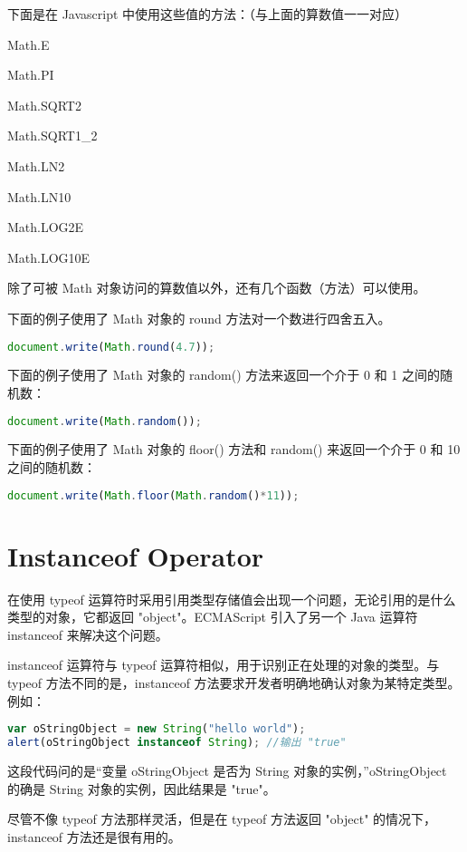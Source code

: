 下面是在 Javascript 中使用这些值的方法：（与上面的算数值一一对应）

\begin{compactitem}
\item Math.E
\item Math.PI
\item Math.SQRT2
\item Math.SQRT1\_2
\item Math.LN2
\item Math.LN10
\item Math.LOG2E
\item Math.LOG10E
\end{compactitem}

除了可被 Math 对象访问的算数值以外，还有几个函数（方法）可以使用。

下面的例子使用了 Math 对象的 round 方法对一个数进行四舍五入。

\begin{lstlisting}[language=JavaScript]
document.write(Math.round(4.7));
\end{lstlisting}



下面的例子使用了 Math 对象的 random() 方法来返回一个介于 0 和 1 之间的随机数：


\begin{lstlisting}[language=JavaScript]
document.write(Math.random());
\end{lstlisting}

下面的例子使用了 Math 对象的 floor() 方法和 random() 来返回一个介于 0 和 10 之间的随机数：

\begin{lstlisting}[language=JavaScript]
document.write(Math.floor(Math.random()*11));
\end{lstlisting}



\section{Instanceof Operator}



在使用 typeof 运算符时采用引用类型存储值会出现一个问题，无论引用的是什么类型的对象，它都返回 "object"。ECMAScript 引入了另一个 Java 运算符 instanceof 来解决这个问题。

instanceof 运算符与 typeof 运算符相似，用于识别正在处理的对象的类型。与 typeof 方法不同的是，instanceof 方法要求开发者明确地确认对象为某特定类型。例如：


\begin{lstlisting}[language=JavaScript]
var oStringObject = new String("hello world");
alert(oStringObject instanceof String);	//输出 "true"
\end{lstlisting}

这段代码问的是“变量 oStringObject 是否为 String 对象的实例，”oStringObject 的确是 String 对象的实例，因此结果是 "true"。

尽管不像 typeof 方法那样灵活，但是在 typeof 方法返回 "object" 的情况下，instanceof 方法还是很有用的。
